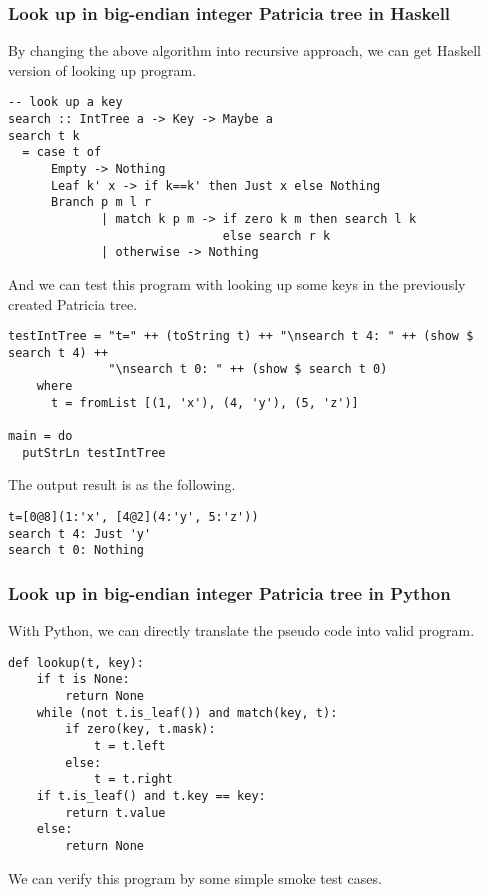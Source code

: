 \documentclass{article}
\begin{document}
\subsubsection*{Look up in big-endian integer Patricia tree in Haskell}
By changing the above algorithm into recursive approach, we can get
Haskell version of looking up program.

\lstset{language=Haskell}
\begin{lstlisting}
-- look up a key
search :: IntTree a -> Key -> Maybe a
search t k 
  = case t of
      Empty -> Nothing
      Leaf k' x -> if k==k' then Just x else Nothing
      Branch p m l r 
             | match k p m -> if zero k m then search l k
                              else search r k
             | otherwise -> Nothing
\end{lstlisting}

And we can test this program with looking up some keys in the
previously created Patricia tree.

\begin{lstlisting}
testIntTree = "t=" ++ (toString t) ++ "\nsearch t 4: " ++ (show $ search t 4) ++
              "\nsearch t 0: " ++ (show $ search t 0)
    where
      t = fromList [(1, 'x'), (4, 'y'), (5, 'z')]

main = do
  putStrLn testIntTree
\end{lstlisting}

The output result is as the following.

\begin{verbatim}
t=[0@8](1:'x', [4@2](4:'y', 5:'z'))
search t 4: Just 'y'
search t 0: Nothing
\end{verbatim}

\subsubsection*{Look up in big-endian integer Patricia tree in Python}
With Python, we can directly translate the pseudo code into valid
program.

\lstset{language=Python}
\begin{lstlisting}
def lookup(t, key):
    if t is None:
        return None
    while (not t.is_leaf()) and match(key, t):
        if zero(key, t.mask):
            t = t.left
        else:
            t = t.right
    if t.is_leaf() and t.key == key:
        return t.value
    else:
        return None
\end{lstlisting}

We can verify this program by some simple smoke test cases.
\end{document}
